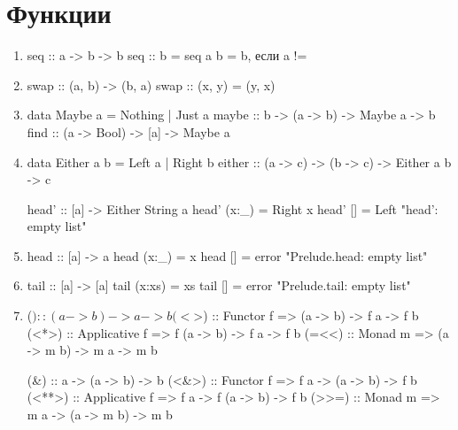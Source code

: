 \documentclass[12pt,a4paper]{article}
\begin{document}
\section{Функции}
\begin{enumerate}
\item 
\begin{hscode}
seq :: a -> b -> b
seq :: \bot b =  \bot
seq a b = b, если a != \bot
\end{hscode}
\item
\begin{hscode}
swap :: (a, b) -> (b, a)
swap :: (x, y) = (y, x)
\end{hscode}
\item
\begin{hscode}
data Maybe a = Nothing | Just a
maybe :: b -> (a -> b) -> Maybe a -> b
find :: (a -> Bool) -> [a] -> Maybe a
\end{hscode}
\item
\begin{hscode}
data Either a b = Left a | Right b
either :: (a -> c) -> (b -> c) -> Either a b -> c

head' :: [a] -> Either String a
head' (x:_) = Right x
head' [] = Left "head': empty list"
\end{hscode}
\item
\begin{hscode}
head :: [a] -> a
head (x:_) = x
head [] = error "Prelude.head: empty list"
\end{hscode}
\item
\begin{hscode}
tail :: [a] -> [a]
tail (x:xs) = xs
tail [] = error "Prelude.tail: empty list"
\end{hscode}



\item
\begin{hscode}
	($)    ::                  (a -> b) -> a -> b
	(<$>)  :: Functor f =>     (a -> b) -> f a -> f b
	(<*>)  :: Applicative f => f (a -> b) -> f a -> f b
	(=<<)  :: Monad m =>       (a -> m b) -> m a -> m b

	(&)    ::                  a -> (a -> b) -> b
	(<&>)  :: Functor f =>     f a -> (a -> b) -> f b
	(<**>) :: Applicative f => f a -> f (a -> b) -> f b
	(>>=)  :: Monad m =>       m a -> (a -> m b) -> m b
\end{hscode}


\end{enumerate} 
\end{document}
